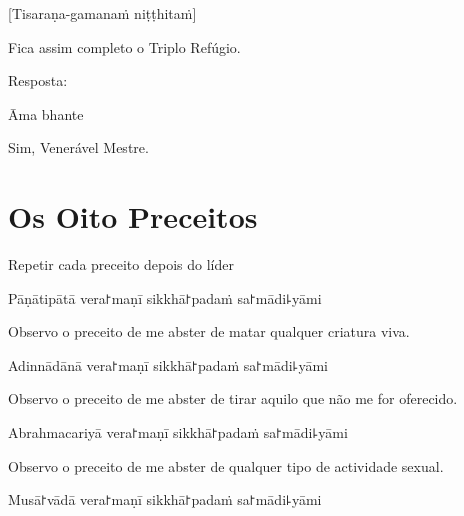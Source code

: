 [Tisaraṇa-gamanaṁ niṭṭhitaṁ]

\begin{english}
  Fica assim completo o Triplo Refúgio.
\end{english}

\begin{instruction}
  Resposta:
\end{instruction}

Āma bhante

\begin{english}
  Sim, Venerável Mestre.
\end{english}

\chapter{Os Oito Preceitos}

\begin{instruction}
  Repetir cada preceito depois do líder
\end{instruction}

\begin{precept}
  \setcounter{enumi}{0}
  \item Pāṇātipātā vera꜓maṇī sikkhā꜓padaṁ sa꜓mādi꜕yāmi
\end{precept}

\begin{english}
  Observo o preceito de me abster de matar qualquer criatura viva.
\end{english}

\begin{precept}
  \setcounter{enumi}{1}
  \item Adinnādānā vera꜓maṇī sikkhā꜓padaṁ sa꜓mādi꜕yāmi
\end{precept}

\begin{english}
  Observo o preceito de me abster de tirar aquilo que não me for oferecido.
\end{english}

\begin{precept}
  \setcounter{enumi}{2}
  \item Abrahmacariyā vera꜓maṇī sikkhā꜓padaṁ sa꜓mādi꜕yāmi
\end{precept}

\begin{english}
  Observo o preceito de me abster de qualquer tipo de actividade sexual.
\end{english}

\begin{precept}
  \setcounter{enumi}{3}
  \item Musā꜓vādā vera꜓maṇī sikkhā꜓padaṁ sa꜓mādi꜕yāmi
\end{precept}

